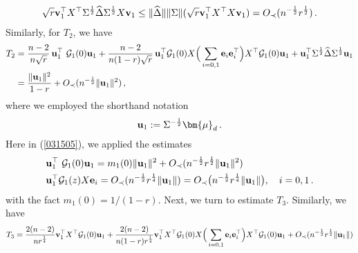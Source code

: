 \documentclass[12pt]{article}
\numberwithin{equation}{section}
\theoremstyle{remark}
\newcommand{\1}{{\rm 1}\kern-0.24em{\rm I}}
\begin{document}
\begin{appendices}
 \begin{align*}
 \sqrt r {\bf v}_1^{\top}{X}^{\top} \Sigma^{\frac 12} \widehat \Delta \Sigma^{\frac 12}  {X} {\bf v}_1\leq \Vert \widehat \Delta \Vert \Vert \Sigma\Vert   (\sqrt r {\bf v}_1^{\top}{X}^{\top}{X} {\bf v}_1) = O_\prec (n^{-\frac 12}r^{\frac 12})\,.
 \end{align*}
 Similarly, for $T_2$, we have 
 \begin{align}
 T_2 
 & = \frac {n-2}{n\sqrt r}\,   {\bf u}_1^{\top} \ \mathcal{G}_1(0){\bf u}_1
+  \frac {n-2}{n(1-r)\sqrt r}\,   {\bf {u}}_1^{\top} \mathcal{G}_1(0){X}\Big( \sum_{i=0,1} {\bf e}_i {\bf e}_i^{\top}  \Big) {X}^{\top} \mathcal{G}_1(0) {\bf u}_1 +  {\bf u}_1^{\top} \Sigma^{\frac 12} \widehat \Delta \Sigma^{\frac  12}  {\bf u}_1 \notag\\
&=\frac{ \Vert {\bf u}_1\Vert^2 }{1-r}  + O_\prec(n^{-\frac 12}\Vert {\bf u}_1\Vert^2)\,, \label{031505}
 \end{align}
 where we employed the shorthand notation 
 \begin{align}
 {\bf u}_1:= \Sigma^{-\frac 12} {\bm{\mu}}_d\,. \label{def of mu1}
 \end{align} 
 Here in  (\ref{031505}), we applied the estimates
 \begin{align}
 & {\bf u}_1^{\top} \ \mathcal{G}_1(0){\bf u}_1 = m_1(0) \Vert {\bf u}_1\Vert^2 + O_\prec (n^{-\frac 12}r^{\frac 12}\Vert {\bf u}_1 \Vert^2)  \label{eq:est(1)}\\
 & {\bf u}_1^{\top} \mathcal{G}_1(z){X} {\bf e}_i =  O_\prec(n^{-\frac 12}r^{\frac 14}\Vert {\bf u}_1  \Vert ) = O_\prec \big(n^{-\frac 12} r^{\frac 14}\Vert {\bf u}_1\Vert \big),\quad i=0,1\,.   \label{eq:est(2)}
 \end{align}
 with the fact $m_1(0)= 1/(1-r)$. 
Next, we turn to estimate $T_3$. Similarly, we have
\begin{align*}
T_3
&= \frac{2(n-2)}{nr^{\frac 14}}  {\bf v}_1^{\top} {X}^{\top} \mathcal{G}_1(0){\bf u}_1 +  \frac{2(n-2)}{n(1-r)r^{\frac 14}}  {\bf v}_1^{\top} {X}^{\top} \mathcal{G}_1(0){X}\Big(\sum_{i=0,1} {\bf e}_i{\bf e}_i^{\top} \Big){X}^{\top} \mathcal{G}_1(0){\bf u}_1  + O_\prec(n^{-\frac 12}r^{\frac 12}\Vert {\bf u}_1\Vert) \notag\\

\end{align*}
\end{appendices}
\end{document}
